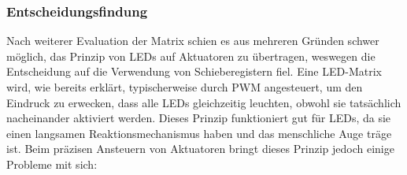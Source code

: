 \subsubsection{Entscheidungsfindung}

Nach weiterer Evaluation der Matrix schien es aus mehreren Gründen schwer möglich, das Prinzip von LEDs auf Aktuatoren
zu übertragen, weswegen die Entscheidung auf die Verwendung von Schieberegistern fiel. \newline
Eine LED-Matrix wird, wie bereits erklärt,
typischerweise durch \ac{PWM} angesteuert, um den Eindruck zu erwecken, dass alle
LEDs gleichzeitig leuchten, obwohl sie tatsächlich nacheinander aktiviert werden. Dieses Prinzip funktioniert gut für LEDs,
da sie einen langsamen Reaktionsmechanismus haben und das menschliche Auge träge ist.
Beim präzisen Ansteuern von Aktuatoren bringt dieses Prinzip jedoch einige Probleme mit sich:

